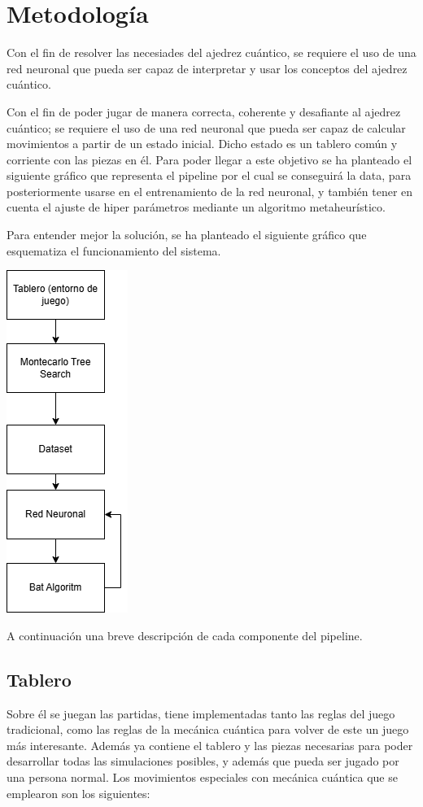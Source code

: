 \section{Metodología}
Con el fin de resolver las necesiades del ajedrez cuántico, se requiere el uso de una red neuronal que pueda ser capaz de interpretar y usar los conceptos del ajedrez cuántico.

Con el fin de poder jugar de manera correcta, coherente y desafiante al ajedrez cuántico; se requiere el uso de una red neuronal que pueda ser capaz de calcular movimientos a partir de un estado inicial. Dicho estado es un tablero común y corriente con las piezas en él. Para poder llegar a este objetivo se ha planteado el siguiente gráfico que representa el pipeline por el cual se conseguirá la data, para posteriormente usarse en el entrenamiento de la red neuronal, y también tener en cuenta el ajuste de hiper parámetros mediante un algoritmo metaheurístico.

Para entender mejor la solución, se ha  planteado el siguiente gráfico que esquematiza  el funcionamiento del sistema.
\begin{center}
	\includegraphics[scale=0.5] {Imagenes/Trabajo_RED_NEURONAL.drawio.png}
\end{center}

A continuación una breve descripción de cada componente del pipeline.

\subsection{Tablero}
Sobre él se juegan las partidas, tiene implementadas tanto las reglas del juego tradicional, como las reglas de la mecánica cuántica para volver de este un juego más interesante. Además ya contiene el tablero y las piezas necesarias para poder desarrollar todas las simulaciones posibles, y además que pueda ser jugado por una persona normal. Los movimientos especiales con mecánica cuántica que se emplearon son los siguientes:
